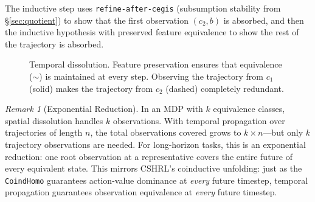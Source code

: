 \documentclass[9pt,a4paper]{article}
\theoremstyle{plain}
\theoremstyle{definition}
\theoremstyle{remark}
\newtheorem{remark}{Remark}
\begin{document}
\noindent The inductive step uses \texttt{refine-after-cegis} (subsumption stability from \S\ref{sec:quotient}) to show that the first observation $(c_2, b)$ is absorbed, and then the inductive hypothesis with preserved feature equivalence to show the rest of the trajectory is absorbed.

\begin{figure}[H]
\centering
{}
\caption{Temporal dissolution.  Feature preservation ensures that equivalence ($\sim$) is maintained at every step.  Observing the trajectory from $c_1$ (solid) makes the trajectory from $c_2$ (dashed) completely redundant.}
\label{fig:temporal}
\end{figure}

\begin{remark}[Exponential Reduction]
In an MDP with $k$ equivalence classes, spatial dissolution handles $k$ observations.  With temporal propagation over trajectories of length $n$, the total observations covered grows to $k \times n$---but only $k$ trajectory observations are needed.  For long-horizon tasks, this is an exponential reduction: one root observation at a representative covers the entire future of every equivalent state.  This mirrors CSHRL's coinductive unfolding: just as the \texttt{CoindHomo} guarantees action-value dominance at \emph{every} future timestep, temporal propagation guarantees observation equivalence at \emph{every} future timestep.
\end{remark}
\end{document}
